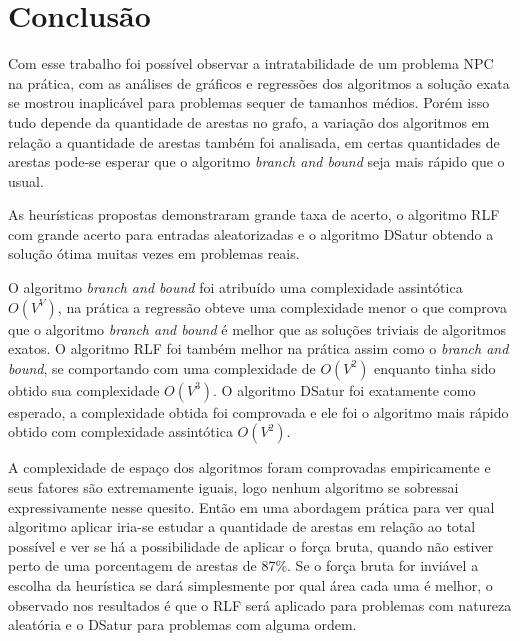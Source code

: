 \documentclass[12pt]{article}
\begin{document}
\section{Conclusão}
\label{sec:org2909720}

Com esse trabalho foi possível observar a intratabilidade de um problema NPC na prática, com as análises de gráficos e regressões dos algoritmos a solução exata se mostrou inaplicável para problemas sequer de tamanhos médios. Porém isso tudo depende da quantidade de arestas no grafo, a variação dos algoritmos em relação a quantidade de arestas também foi analisada, em certas quantidades de arestas pode-se esperar que o algoritmo \emph{branch and bound} seja mais rápido que o usual.

As heurísticas propostas demonstraram grande taxa de acerto, o algoritmo RLF com grande acerto para entradas aleatorizadas e o algoritmo DSatur obtendo a solução ótima muitas vezes em problemas reais.

O algoritmo \emph{branch and bound} foi atribuído uma complexidade assintótica \(O(V^V)\), na prática a regressão obteve uma complexidade menor o que comprova que o algoritmo \emph{branch and bound} é melhor que as soluções triviais de algoritmos exatos. O algoritmo RLF foi também melhor na prática assim como o \emph{branch and bound}, se comportando com uma complexidade de \(O(V^2)\) enquanto tinha sido obtido sua complexidade \(O(V^3)\). O algoritmo DSatur foi exatamente como esperado, a complexidade obtida foi comprovada e ele foi o algoritmo mais rápido obtido com complexidade assintótica \(O(V^2)\).

A complexidade de espaço dos algoritmos foram comprovadas empiricamente e seus fatores são extremamente iguais, logo nenhum algoritmo se sobressai expressivamente nesse quesito. Então em uma abordagem prática para ver qual algoritmo aplicar iria-se estudar a quantidade de arestas em relação ao total possível e ver se há a possibilidade de aplicar o força bruta, quando não estiver perto de uma porcentagem de arestas de 87\%. Se o força bruta for inviável a escolha da heurística se dará simplesmente por qual área cada uma é melhor, o observado nos resultados é que o RLF será aplicado para problemas com natureza aleatória e o DSatur para problemas com alguma ordem.




\end{document}
